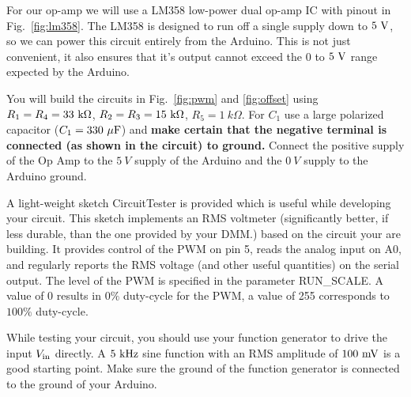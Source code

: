 \documentclass[12pt]{article}
\begin{document}
For our op-amp we will use a LM358 low-power dual op-amp IC with pinout in Fig.~\ref{fig:lm358}.
The LM358 is designed to run off a single supply down to $5~\rm V$, so we can power this circuit entirely from the Arduino.  This is not just convenient, it also ensures that it's output cannot exceed the $0$ to $5~\rm V$ range expected by the Arduino.

You will build the circuits in Fig.~\ref{fig:pwm}  and \ref{fig:offset} using $R_1 = R_4 = 33~\rm k\Omega$, $R_2 = R_3 = 15~\rm k\Omega$, $R_5=1~k\Omega$.  For $C_1$ use a large polarized capacitor ($C_1=330~\rm  \mu F$) and {\bf make certain that the negative terminal is connected (as shown in the circuit) to ground.}  Connect the positive supply of the Op Amp to the $5~V$ supply of the Arduino and the $0~V$ supply to the Arduino ground.  

A light-weight sketch {\rm CircuitTester} is provided which is useful while developing your circuit.  This sketch implements an RMS voltmeter (significantly better, if less durable, than the one provided by your DMM.) based on the circuit your are building.  It provides control of the PWM on pin 5, reads the analog input on A0, and regularly reports the RMS voltage (and other useful quantities) on the serial output.
The level of the PWM is specified in the parameter {\rm RUN\_SCALE}.  A value of 0 results in $0\%$ duty-cycle for the PWM, a value of 255 corresponds to $100\%$ duty-cycle.

While testing your circuit, you should use your function generator to drive the input $V_{\rm in}$ directly.  A $5~\rm kHz$ sine function with an RMS amplitude of $100~\rm mV$ is a good starting point.  Make sure the ground of the function generator is connected to the ground of your Arduino.
\end{document}
